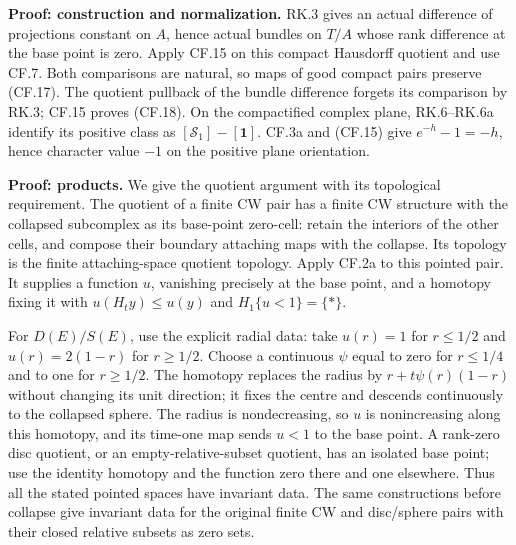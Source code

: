 \documentclass[
  11pt,
]{article}
\begin{document}
\textbf{Proof: construction and normalization.} RK.3 gives an actual
difference of projections constant on \(A\), hence actual bundles on
\(T/A\) whose rank difference at the base point is zero. Apply CF.15 on
this compact Hausdorff quotient and use CF.7. Both comparisons are
natural, so maps of good compact pairs preserve (CF.17). The quotient
pullback of the bundle difference forgets its comparison by RK.3; CF.15
proves (CF.18). On the compactified complex plane, RK.6--RK.6a identify
its positive class as \([\mathcal S_1]-[\mathbf1]\). CF.3a and (CF.15)
give \(e^{-h}-1=-h\), hence character value \(-1\) on the positive plane
orientation.

\textbf{Proof: products.} We give the quotient argument with its
topological requirement. The quotient of a finite CW pair has a finite
CW structure with the collapsed subcomplex as its base-point zero-cell:
retain the interiors of the other cells, and compose their boundary
attaching maps with the collapse. Its topology is the finite
attaching-space quotient topology. Apply CF.2a to this pointed pair. It
supplies a function \(u\), vanishing precisely at the base point, and a
homotopy fixing it with \(u(H_t y)\leq u(y)\) and \(H_1\{u<1\}=\{*\}\).

For \(D(E)/S(E)\), use the explicit radial data: take \(u(r)=1\) for
\(r\leq1/2\) and \(u(r)=2(1-r)\) for \(r\geq1/2\). Choose a continuous
\(\psi\) equal to zero for \(r\leq1/4\) and to one for \(r\geq1/2\). The
homotopy replaces the radius by \(r+t\psi(r)(1-r)\) without changing its
unit direction; it fixes the centre and descends continuously to the
collapsed sphere. The radius is nondecreasing, so \(u\) is nonincreasing
along this homotopy, and its time-one map sends \(u<1\) to the base
point. A rank-zero disc quotient, or an empty-relative-subset quotient,
has an isolated base point; use the identity homotopy and the function
zero there and one elsewhere. Thus all the stated pointed spaces have
invariant data. The same constructions before collapse give invariant
data for the original finite CW and disc/sphere pairs with their closed
relative subsets as zero sets.
\end{document}
